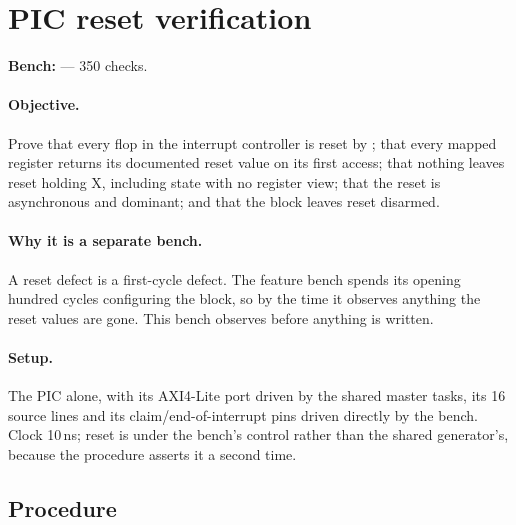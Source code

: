 \section{PIC reset verification}
\label{sec:vp-picreset}

\textbf{Bench:}  --- 350 checks.

\paragraph{Objective.} Prove that every flop in the interrupt controller is
reset by ; that every mapped register returns its documented reset
value on its first access; that nothing leaves reset holding X, including state
with no register view; that the reset is asynchronous and dominant; and that the
block leaves reset disarmed.

\paragraph{Why it is a separate bench.} A reset defect is a first-cycle defect.
The feature bench spends its opening hundred cycles configuring the block, so by
the time it observes anything the reset values are gone. This bench observes
before anything is written.

\paragraph{Setup.} The PIC alone, with its AXI4-Lite port driven by the shared
master tasks, its 16 source lines and its claim/end-of-interrupt pins driven
directly by the bench. Clock 10\,ns; reset is under the bench's control rather
than the shared generator's, because the procedure asserts it a second time.

\subsection*{Procedure}

